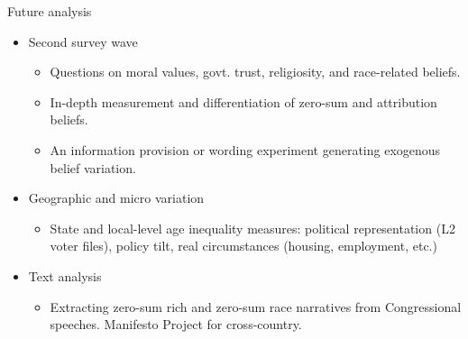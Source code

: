 \documentclass[aspectratio=169]{beamer}
\begin{document}
\begin{frame}{Future analysis}

\begin{itemize}
    \item Second survey wave
    \begin{itemize}
        \item Questions on moral values, govt. trust, religiosity, and race-related beliefs.
        \item In-depth measurement and differentiation of zero-sum and attribution beliefs. %
        \item An information provision or wording experiment generating exogenous belief variation.
    \end{itemize}
    \item Geographic and micro variation
    \begin{itemize}
        \item State and local-level age inequality measures: political representation (L2 voter files), policy tilt, real circumstances (housing, employment, etc.)
    \end{itemize}
    \item Text analysis
    \begin{itemize}
        \item Extracting zero-sum rich and zero-sum race narratives from Congressional speeches. Manifesto Project for cross-country.
    \end{itemize}
\end{itemize}
    
\end{frame}
\end{document}
